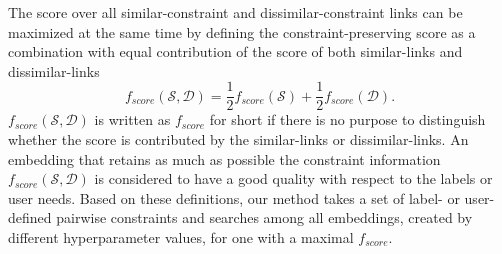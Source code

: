 The score over all similar-constraint and dissimilar-constraint links can be maximized at the same time by defining the constraint-preserving score as a combination with equal contribution of the score of both similar-links and dissimilar-links $$f_{score}(\mathcal{S},\mathcal{D}) = \frac{1}{2}f_{score}(\mathcal{S}) + \frac{1}{2}f_{score}(\mathcal{D}).$$
$f_{score}(\mathcal{S},\mathcal{D})$ is written as $f_{score}$ for short if there is no purpose to distinguish whether the score is contributed by the similar-links or dissimilar-links.
An embedding that retains as much as possible the constraint information $f_{score}(\mathcal{S},\mathcal{D})$ is considered to have a good quality with respect to the labels or user needs.
Based on these definitions, our method takes a set of label- or user-defined pairwise constraints and searches among all embeddings, created by different hyperparameter values, for one with a maximal $f_{score}$.

